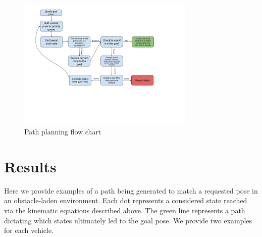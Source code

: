\documentclass{article}
\begin{document}
\begin{figure}[H]
    \centering
    \includegraphics[width = 0.75\textwidth]{imgs/RBE550 Valet flow chart.png}
    \caption{Path planning flow chart}
    \label{fig:path-planning-flowchart}
\end{figure}

\section*{Results}

Here we provide examples of a path being generated to match a requested pose in an obstacle-laden environment. Each dot represents a considered state reached via the kinematic equations described above. The green line represents a path dictating which states ultimately led to the goal pose. We provide two examples for each vehicle.
\end{document}
